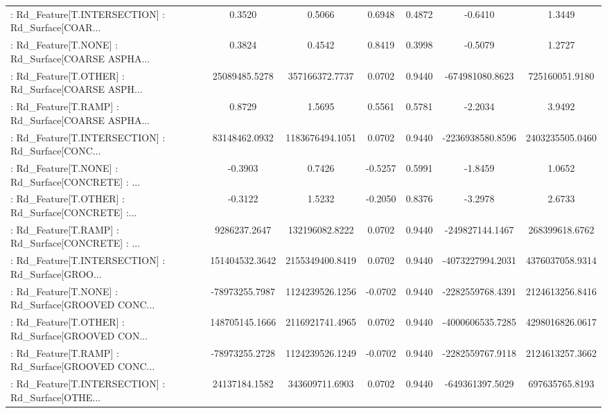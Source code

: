 \begin{longtable}{p{4cm}cccccc}
 : Rd\_Feature[T.INTERSECTION] : Rd\_Surface[COAR... &            0.3520 &            0.5066 &  0.6948 &       0.4872 &            -0.6410 &            1.3449 \\
 : Rd\_Feature[T.NONE] : Rd\_Surface[COARSE ASPHA... &            0.3824 &            0.4542 &  0.8419 &       0.3998 &            -0.5079 &            1.2727 \\
 : Rd\_Feature[T.OTHER] : Rd\_Surface[COARSE ASPH... &     25089485.5278 &    357166372.7737 &  0.0702 &       0.9440 &    -674981080.8623 &    725160051.9180 \\
 : Rd\_Feature[T.RAMP] : Rd\_Surface[COARSE ASPHA... &            0.8729 &            1.5695 &  0.5561 &       0.5781 &            -2.2034 &            3.9492 \\
 : Rd\_Feature[T.INTERSECTION] : Rd\_Surface[CONC... &     83148462.0932 &   1183676494.1051 &  0.0702 &       0.9440 &   -2236938580.8596 &   2403235505.0460 \\
 : Rd\_Feature[T.NONE] : Rd\_Surface[CONCRETE] : ... &           -0.3903 &            0.7426 & -0.5257 &       0.5991 &            -1.8459 &            1.0652 \\
 : Rd\_Feature[T.OTHER] : Rd\_Surface[CONCRETE] :... &           -0.3122 &            1.5232 & -0.2050 &       0.8376 &            -3.2978 &            2.6733 \\
 : Rd\_Feature[T.RAMP] : Rd\_Surface[CONCRETE] : ... &      9286237.2647 &    132196082.8222 &  0.0702 &       0.9440 &    -249827144.1467 &    268399618.6762 \\
 : Rd\_Feature[T.INTERSECTION] : Rd\_Surface[GROO... &    151404532.3642 &   2155349400.8419 &  0.0702 &       0.9440 &   -4073227994.2031 &   4376037058.9314 \\
 : Rd\_Feature[T.NONE] : Rd\_Surface[GROOVED CONC... &    -78973255.7987 &   1124239526.1256 & -0.0702 &       0.9440 &   -2282559768.4391 &   2124613256.8416 \\
 : Rd\_Feature[T.OTHER] : Rd\_Surface[GROOVED CON... &    148705145.1666 &   2116921741.4965 &  0.0702 &       0.9440 &   -4000606535.7285 &   4298016826.0617 \\
 : Rd\_Feature[T.RAMP] : Rd\_Surface[GROOVED CONC... &    -78973255.2728 &   1124239526.1249 & -0.0702 &       0.9440 &   -2282559767.9118 &   2124613257.3662 \\
 : Rd\_Feature[T.INTERSECTION] : Rd\_Surface[OTHE... &     24137184.1582 &    343609711.6903 &  0.0702 &       0.9440 &    -649361397.5029 &    697635765.8193 \\

\end{longtable}
